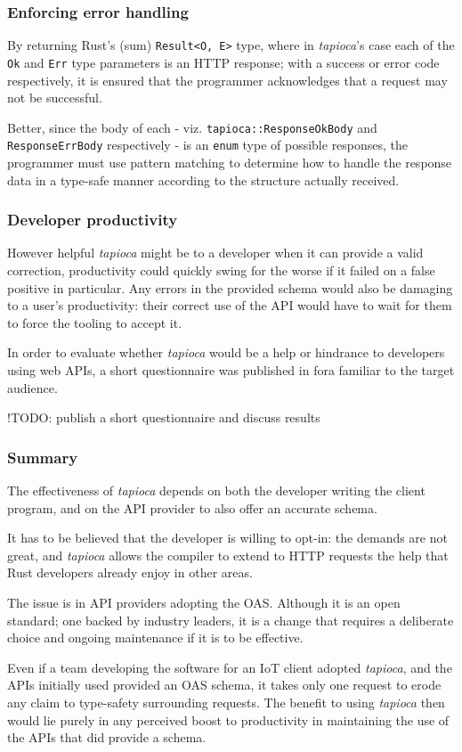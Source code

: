 \subsubsection{Enforcing error handling} \label{concl:eval:err-handle}

By returning Rust's (sum) \texttt{Result<O, E>} type, where in \emph{tapioca}'s case each of the \texttt{Ok} and \texttt{Err} type parameters is an HTTP response; with a success or error code respectively, it is ensured that the programmer acknowledges that a request may not be successful.

Better, since the body of each - viz. \texttt{tapioca::ResponseOkBody} and \texttt{ResponseErrBody} respectively - is an \texttt{enum} type of possible responses, the programmer must use pattern matching to determine how to handle the response data in a type-safe manner according to the structure actually received.

\subsubsection{Developer productivity} \label{eval:tapioca:productivity}

However helpful \emph{tapioca} might be to a developer when it can provide a valid correction, productivity could quickly swing for the worse if it failed on a false positive in particular. Any errors in the provided schema would also be damaging to a user's productivity: their correct use of the API would have to wait for them to force the tooling to accept it.

In order to evaluate whether \emph{tapioca} would be a help or hindrance to developers using web APIs, a short questionnaire was published in fora familiar to the target audience.

!TODO: publish a short questionnaire and discuss results

\subsubsection{Summary} \label{eval:tapioca:summary}

The effectiveness of \emph{tapioca} depends on both the developer writing the client program, and on the API provider to also offer an accurate schema.

It has to be believed that the developer is willing to opt-in: the demands are not great, and \emph{tapioca} allows the compiler to extend to HTTP requests the help that Rust developers already enjoy in other areas.

The issue is in API providers adopting the OAS. Although it is an open standard; one backed by industry leaders, it is a change that requires a deliberate choice and ongoing maintenance if it is to be effective.

Even if a team developing the software for an IoT client adopted \emph{tapioca}, and the APIs initially used provided an OAS schema, it takes only one request to erode any claim to type-safety surrounding requests. The benefit to using \emph{tapioca} then would lie purely in any perceived boost to productivity in maintaining the use of the APIs that did provide a schema.